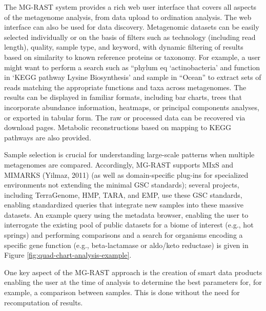 \documentclass[12pt,fullpage]{report}
\begin{document}
The MG-RAST system provides a rich web user interface that covers all aspects of the metagenome analysis, from data upload to ordination analysis. The web interface can also be used for data discovery. Metagenomic datasets can be easily selected individually or on the basis of filters such as technology (including read length), quality, sample type, and keyword, with dynamic filtering of results based on similarity to known reference proteins or taxonomy. For example, a user might want to perform a search such as ``phylum eq `actinobacteria' and function in `KEGG pathway Lysine Biosynthesis' and sample in ``Ocean'' to extract sets of reads matching the appropriate functions and taxa across metagenomes. The results can be displayed in familiar formats, including bar charts, trees that incorporate abundance information, heatmaps, or principal components analyses, or exported in tabular form. The raw or processed data can be recovered via download pages. Metabolic reconstructions based on mapping to KEGG pathways are also provided.

Sample selection is crucial for understanding large-scale patterns when multiple metagenomes are compared. Accordingly, MG-RAST supports MIxS and MIMARKS (Yilmaz, 2011) (as well as domain-specific plug-ins for specialized environments not extending the minimal GSC standards); several projects, including TerraGenome, HMP, TARA, and EMP, use these GSC standards, enabling standardized queries that integrate new samples into these massive datasets. An example query using the metadata browser, enabling the user to interrogate the existing pool of public datasets for a biome of interest (e.g., hot springs) and performing comparisons and a search for organisms encoding a specific gene function (e.g., beta-lactamase or aldo/keto reductase) is given in
Figure \ref{fig:quad-chart-analysis-example}.

One key aspect of the MG-RAST approach is the creation of smart data products enabling the user at the time of analysis to determine the best parameters for, for example, a comparison between samples. This is done without the need for recomputation of results.
\end{document}
